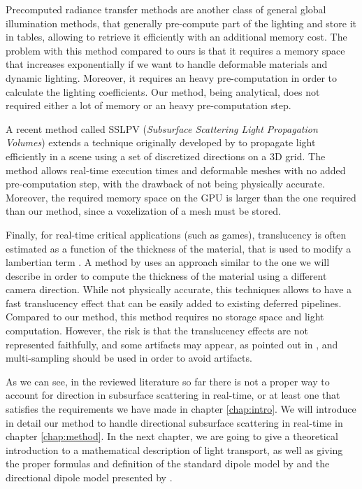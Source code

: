 Precomputed radiance transfer methods are another class of general global illumination methods, that generally pre-compute part of the lighting and store it in tables\citep{Donner:2009:EBM:1531326.1531336}, allowing to retrieve it efficiently with an additional memory cost. The problem with this method compared to ours is that it requires a memory space that increases exponentially if we want to handle deformable materials and dynamic lighting. Moreover, it requires an heavy pre-computation in order to calculate the lighting coefficients. Our method, being analytical, does not required either a lot of memory or an heavy pre-computation step. 

A recent method called SSLPV (\emph{Subsurface Scattering Light Propagation Volumes}) \citep{Borlum:2011:SSL:2018323.2018325} extends a technique originally developed by \cite{Kaplanyan:2010:CLP:1730804.1730821} to propagate light efficiently in a scene using a set of discretized directions on a 3D grid. The method allows real-time execution times and deformable meshes with no added pre-computation step, with the drawback of not being physically accurate. Moreover, the required memory space on the GPU is larger than the one required than our method, since a voxelization of a mesh must be stored. 

Finally, for real-time critical applications (such as games), translucency is often estimated as a function of the thickness of the material, that is used to modify a lambertian term \citep{Tomaszewska2012,greenrtss}. A method by \cite{Kosaka:2012:RAR:2407156.2407206} uses an approach similar to the one we will describe in order to compute the thickness of the material using a different camera direction. While not physically accurate, this techniques allows to have a fast translucency effect that can be easily added to existing deferred pipelines. Compared to our method, this method requires no storage space and light computation. However, the risk is that the translucency effects are not represented faithfully, and some artifacts may appear, as pointed out in \cite{greenrtss}, and multi-sampling should be used in order to avoid artifacts. 

As we can see, in the reviewed literature so far there is not a proper way to account for direction in subsurface scattering in real-time, or at least one that satisfies the requirements we have made in chapter \ref{chap:intro}. We will introduce in detail our method to handle directional subsurface scattering in real-time in chapter \ref{chap:method}. In the next chapter, we are going to give a theoretical introduction to a mathematical description of light transport, as well as giving the proper formulas and definition of the standard dipole model by \cite{Jensen:2001:PMS:383259.383319} and the directional dipole model presented by \cite{IMM2013-06646}. 
